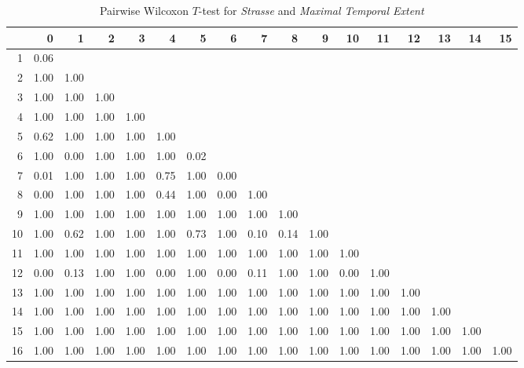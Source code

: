 \begin{table}[ht!]
	\tiny
	\setlength{\tabcolsep}{4pt}
	\centering
  \begin{tabular}{rrrrrrrrrrrrrrrrr}
    \hline
   & 0 & 1 & 2 & 3 & 4 & 5 & 6 & 7 & 8 & 9 & 10 & 11 & 12 & 13 & 14 & 15 \\ 
    \hline
  1 & 0.06 &  &  &  &  &  &  &  &  &  &  &  &  &  &  &  \\ 
    2 & 1.00 & 1.00 &  &  &  &  &  &  &  &  &  &  &  &  &  &  \\ 
    3 & 1.00 & 1.00 & 1.00 &  &  &  &  &  &  &  &  &  &  &  &  &  \\ 
    4 & 1.00 & 1.00 & 1.00 & 1.00 &  &  &  &  &  &  &  &  &  &  &  &  \\ 
    5 & 0.62 & 1.00 & 1.00 & 1.00 & 1.00 &  &  &  &  &  &  &  &  &  &  &  \\ 
    6 & 1.00 & 0.00 & 1.00 & 1.00 & 1.00 & 0.02 &  &  &  &  &  &  &  &  &  &  \\ 
    7 & 0.01 & 1.00 & 1.00 & 1.00 & 0.75 & 1.00 & 0.00 &  &  &  &  &  &  &  &  &  \\ 
    8 & 0.00 & 1.00 & 1.00 & 1.00 & 0.44 & 1.00 & 0.00 & 1.00 &  &  &  &  &  &  &  &  \\ 
    9 & 1.00 & 1.00 & 1.00 & 1.00 & 1.00 & 1.00 & 1.00 & 1.00 & 1.00 &  &  &  &  &  &  &  \\ 
    10 & 1.00 & 0.62 & 1.00 & 1.00 & 1.00 & 0.73 & 1.00 & 0.10 & 0.14 & 1.00 &  &  &  &  &  &  \\ 
    11 & 1.00 & 1.00 & 1.00 & 1.00 & 1.00 & 1.00 & 1.00 & 1.00 & 1.00 & 1.00 & 1.00 &  &  &  &  &  \\ 
    12 & 0.00 & 0.13 & 1.00 & 1.00 & 0.00 & 1.00 & 0.00 & 0.11 & 1.00 & 1.00 & 0.00 & 1.00 &  &  &  &  \\ 
    13 & 1.00 & 1.00 & 1.00 & 1.00 & 1.00 & 1.00 & 1.00 & 1.00 & 1.00 & 1.00 & 1.00 & 1.00 & 1.00 &  &  &  \\ 
    14 & 1.00 & 1.00 & 1.00 & 1.00 & 1.00 & 1.00 & 1.00 & 1.00 & 1.00 & 1.00 & 1.00 & 1.00 & 1.00 & 1.00 &  &  \\ 
    15 & 1.00 & 1.00 & 1.00 & 1.00 & 1.00 & 1.00 & 1.00 & 1.00 & 1.00 & 1.00 & 1.00 & 1.00 & 1.00 & 1.00 & 1.00 &  \\ 
    16 & 1.00 & 1.00 & 1.00 & 1.00 & 1.00 & 1.00 & 1.00 & 1.00 & 1.00 & 1.00 & 1.00 & 1.00 & 1.00 & 1.00 & 1.00 & 1.00 \\ 
     \hline
  \end{tabular}
	\caption{Pairwise Wilcoxon $T$-test for \textit{Strasse} and \textit{Maximal Temporal Extent}}
	\label{tbl:wilcoxon_baysis_matched_Strasse_TMax}
\end{table}
